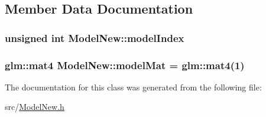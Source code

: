 \subsection{Member Data Documentation}
\subsubsection[{\texorpdfstring{model\+Index}{modelIndex}}]{\setlength{\rightskip}{0pt plus 5cm}unsigned int Model\+New\+::model\+Index\hspace{0.3cm}{\ttfamily [protected]}}\hypertarget{class_model_new_a781a3d136368655e5accac0106785db0}{}\label{class_model_new_a781a3d136368655e5accac0106785db0}
\subsubsection[{\texorpdfstring{model\+Mat}{modelMat}}]{\setlength{\rightskip}{0pt plus 5cm}glm\+::mat4 Model\+New\+::model\+Mat = glm\+::mat4(1)}\hypertarget{class_model_new_ab507d3869cd9aadb4d9b8dd00263bd01}{}\label{class_model_new_ab507d3869cd9aadb4d9b8dd00263bd01}


The documentation for this class was generated from the following file\+:\begin{DoxyCompactItemize}
\item 
src/\hyperlink{_model_new_8h}{Model\+New.\+h}\end{DoxyCompactItemize}

